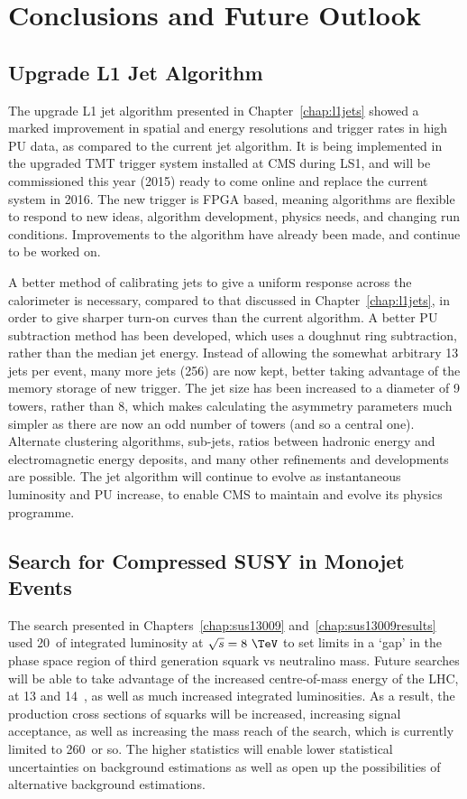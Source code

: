 \chapter{Conclusions and Future Outlook \label{chap_concl}}

\section{Upgrade L1 Jet Algorithm}

The upgrade \ac{L1} jet algorithm presented in Chapter~\ref{chap:l1jets} showed a marked improvement in spatial and energy resolutions
and trigger rates in high \ac{PU} data, as compared to the current jet algorithm. 
It is being implemented in the upgraded \ac{TMT} trigger system installed at \ac{CMS} during LS1, and will be commissioned this year (2015) ready to come online and replace the current system in 2016. 
The new trigger is \ac{FPGA} based, meaning algorithms are flexible to respond to new ideas, algorithm development, physics needs, and changing run conditions. 
Improvements to the algorithm have already been made, and continue to be worked on.

A better method of calibrating jets to give a uniform response across the calorimeter is necessary, compared to that discussed in Chapter~\ref{chap:l1jets}, in order to give sharper turn-on curves than the current algorithm.
A better \ac{PU} subtraction method has been developed, which uses a doughnut ring subtraction, rather than the median jet energy. 
Instead of allowing the somewhat arbitrary 13 jets per event, many more jets (256) are now kept, better taking advantage of the memory storage of new trigger. The jet size has been increased to a diameter of 9 towers, rather than 8, which makes calculating the asymmetry parameters much simpler as there are now an odd number of towers (and so a central one).
Alternate clustering algorithms, sub-jets, ratios between hadronic energy and electromagnetic energy deposits, and many other refinements and developments are possible. 
The jet algorithm will continue to evolve as instantaneous luminosity and \ac{PU} increase, to enable \ac{CMS} to maintain and evolve its physics programme.


\section{Search for Compressed \ac{SUSY} in Monojet Events}

The search presented in Chapters~\ref{chap:sus13009} and~\ref{chap:sus13009results} used 20~\fbinv of integrated luminosity at $\sqrt{s}=8~\TeV$ to set limits in a `gap' in the phase space region of third generation squark vs neutralino mass. 
Future searches will be able to take advantage of the increased centre-of-mass energy of the \ac{LHC}, at 13 and 14~\TeV{}, as well as much increased integrated luminosities. 
As a result, the production cross sections of squarks will be increased, increasing signal acceptance, as well as increasing the mass reach of the search, which is currently limited to 260~\GeV or so. 
The higher statistics will enable lower statistical uncertainties on background estimations as well as open up the possibilities of alternative background estimations.

